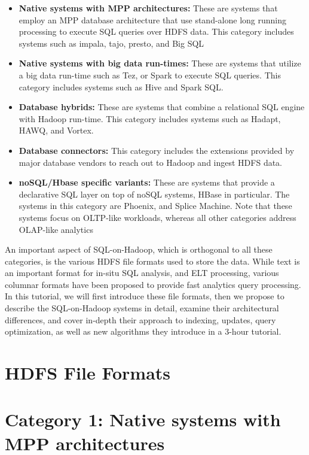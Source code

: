 \documentclass{vldb}
\begin{document}
\begin{itemize}
\item{ {\bf Native systems with MPP architectures:} These are systems that employ an MPP database architecture that use stand-alone long running processing to execute SQL queries over HDFS data. This category includes systems such as impala, tajo, presto, and Big SQL}
\item {{\bf Native systems with big data run-times:} These are systems that utilize a big data run-time such as Tez, or Spark to execute SQL queries. This category includes systems such as Hive and Spark SQL.}
\item{{\bf Database hybrids:} These are systems that combine a relational SQL engine with Hadoop run-time. This category includes systems such as Hadapt, HAWQ, and Vortex.}
\item{ {\bf Database connectors:} This category includes the extensions provided by major database vendors to reach out to Hadoop and ingest HDFS data. } 
\item{ {\bf noSQL/Hbase specific variants:} These are systems that provide a declarative SQL layer on top of noSQL systems, HBase in particular. The systems in this category are Phoenix, and Splice Machine. Note that these systems focus on OLTP-like workloads, whereas all other categories address OLAP-like analytics}
\end{itemize}

An important aspect of SQL-on-Hadoop, which is orthogonal to all these categories, is the various HDFS file formats used to store the data. While text is an important format for in-situ SQL analysis, and ELT processing, various columnar formats have been proposed to provide fast analytics query processing. In this tutorial, we will first introduce these file formats, then we propose to describe the SQL-on-Hadoop systems in detail, examine their architectural differences, and cover in-depth their approach to indexing, updates, query optimization, as well as new algorithms they introduce in a 3-hour tutorial. 

\section{HDFS File Formats}

\section{Category 1: Native systems with MPP architectures}
\end{document}
